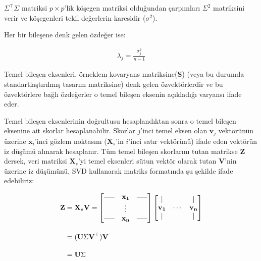 \documentclass[12pt]{article}
\begin{document}
$\Sigma^{\top}\Sigma$ matriksi $p \times p$'lik köşegen matriksi olduğundan çarpımları $\Sigma^2$ matriksini verir ve köşegenleri tekil değerlerin karesidir ($\sigma^2$).

\vspace{1.5em}

Her bir bileşene denk gelen özdeğer ise:

\begin{gather*}
  \lambda_j=\frac{\sigma_j^2}{n-1}
\end{gather*}

Temel bileşen eksenleri, örneklem kovaryans matriksine($\mathbf{S}$) (veya bu durumda standartlaştırılmış tasarım matriksine) denk gelen özvektörlerdir ve bu özvektörlere bağlı özdeğerler o temel bileşen eksenin açıkladığı varyansı ifade eder.

\vspace{1.5em}

Temel bileşen eksenlerinin doğrultusu hesaplandıktan sonra o temel bileşen eksenine ait skorlar hesaplanabilir. Skorlar $j$'inci temel eksen olan $\mathbf{v}_j$ vektörünün üzerine $\mathbf{x}_i$'inci gözlem noktasını ($\mathbf{X}_s$'in $i$'inci satır vektörünü) ifade eden vektörün iz düşümü alınarak hesaplanır. Tüm temel bileşen skorlarını tutan matrikse $\mathbf{Z}$ dersek, veri matriksi $\mathbf{X}_s$'yi temel eksenleri sütun vektör olarak tutan $\mathbf{V}$'nin üzerine iz düşümünü, SVD kullanarak matriks formatında şu şekilde ifade edebiliriz:

\begin{align*}
  \mathbf{Z} &= \mathbf{X}_s \mathbf{V}= \begin{bmatrix}
\rule[0.5ex]{1.5em}{0.4pt} & \mathbf{x_1} & \rule[0.5ex]{1.5em}{0.4pt} \\
& \vdots & \\
\rule[0.5ex]{1.5em}{0.4pt} & \mathbf{x_n} & \rule[0.5ex]{1.5em}{0.4pt}
\end{bmatrix}
\begin{bmatrix}
| & & | \\
\mathbf{v_1} & \cdots & \mathbf{v_n} \\
| & & |
\end{bmatrix} \\[1em]
             &=(\mathbf{U}\Sigma \mathbf{V^\top})\mathbf{V} \\[1em]
             &=\mathbf{U}\Sigma
\end{align*}
\end{document}
